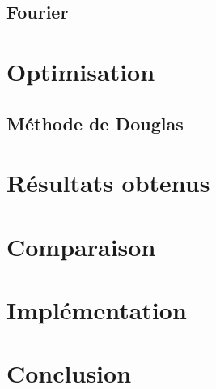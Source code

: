 \documentclass{article}
\begin{document}
\subsection{Fourier \cite{Image}}

\section{Optimisation}
\subsection{Méthode de Douglas \cite{Douglas}}

\section{Résultats obtenus}

\section{Comparaison}

\section{Implémentation}

\section{Conclusion}



\end{document}
